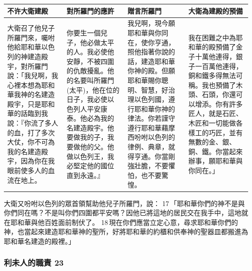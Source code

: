 \begin{table}[H]
\vspace{-5mm}
\hspace{-10mm}
\centering
\begin{tabular}{p{4.2cm}|p{}|p{4.25cm}|p{4.05cm}}\hline\hline
不许大衛建殿&對所羅門的應許&贈言所羅門&大衛為建殿的預備\\\hline
大衛召了他兒子所羅門來，囑咐他給耶和華以色列的神建造殿宇，對所羅門說：「我兒啊，我心裡本想為耶和華我神的名建造殿宇，只是耶和華的話臨到我說：『你流了多人的血，打了多次大仗，你不可為我的名建造殿宇，因為你在我眼前使多人的血流在地上。 
&你要生一個兒子，他必做太平的人。我必使他安靜，不被四圍的仇敵擾亂。他的名要叫所羅門(太平)，他在位的日子，我必使以色列人平安康泰。他必為我的名建造殿宇。他要做我的子，我要做他的父。他做以色列王，我必堅定他的國位直到永遠。』
&我兒啊，現今願耶和華與你同在，使你亨通，照他指著你說的話，建造耶和華你神的殿。但願耶和華賜你聰明、智慧，好治理以色列國，遵行耶和華你神的律法。你若謹守遵行耶和華藉摩西吩咐以色列的律例、典章，就得亨通。你當剛強壯膽，不要懼怕，也不要驚惶。
&我在困難之中為耶和華的殿預備了金子十萬他連得，銀子一百萬他連得，銅和鐵多得無法可稱。我也預備了木頭、石頭，你還可以增添。你有許多匠人，就是石匠、木匠和一切能做各樣工的巧匠，並有無數的金、銀、銅、鐵。你當起來辦事，願耶和華與你同在。」\\\hline
\end{tabular}
\end{table}	 

大衛又吩咐以色列的眾首領幫助他兒子所羅門，說： 17 「耶和華你們的神不是與你們同在嗎？不是叫你們四圍都平安嗎？因他已將這地的居民交在我手中，這地就在耶和華與他百姓面前制伏了。 18 現在你們應當立定心意，尋求耶和華你們的神，也當起來建造耶和華神的聖所，好將耶和華的約櫃和供奉神的聖器皿都搬進為耶和華名建造的殿裡。」


\subsubsection{利未人的職責 23}

